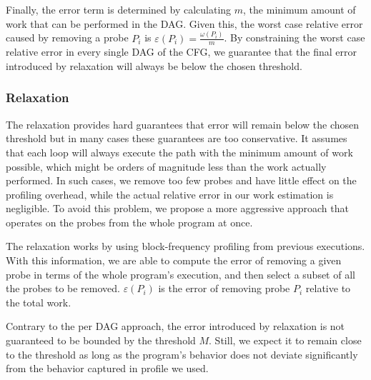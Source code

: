 Finally, the error term is determined by calculating $m$, the minimum amount of work that can be performed in the
DAG. Given this, the worst case relative error caused by removing a probe $P_i$ is $\varepsilon(P_i) = \frac{\omega(P_i)}{m}$. 
By constraining the worst case
relative error in every single DAG of the CFG, we guarantee that the final error introduced by relaxation will always be below the chosen
threshold.


\subsubsection{\WPRelaxTitle Relaxation}

The \WCRelaxLower relaxation provides hard guarantees that error will remain below the chosen threshold but in many cases these
guarantees are too conservative. It assumes that each loop will always execute the path with the minimum amount of work
possible, which might be orders of magnitude less than the work actually performed. In such cases, we remove too few probes and have little
effect on the profiling overhead, while the actual relative error in our work estimation is negligible. To avoid this problem, we
propose a more aggressive approach that operates on the probes from the whole program at once.

The \WPRelaxLower relaxation works by using block-frequency profiling from previous executions. With this information, we are able to
compute the error of removing a given probe in terms of the whole program's execution, and then select a subset of all the probes to be
removed. $\varepsilon(P_i)$ is the error of removing probe $P_i$ relative to the total work.

Contrary to the per DAG approach, the error introduced by \WPRelaxLower relaxation is not guaranteed to be bounded by the threshold $M$.
Still, we expect it to remain close to the threshold as long as the program's behavior does not deviate significantly from the behavior
captured in profile we used.
